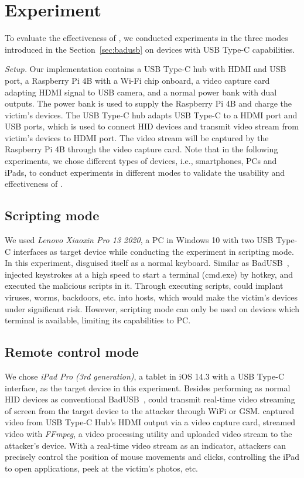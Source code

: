 \section{Experiment}
\label{sec:experiment}

To evaluate the effectiveness of \tool, we conducted experiments in the three modes introduced in the Section~\ref{sec:badusb} on devices with USB Type-C capabilities.

\textit{Setup.} Our implementation contains a USB Type-C hub with HDMI and USB port, a Raspberry Pi 4B with a Wi-Fi chip onboard, a video capture card adapting HDMI signal to USB camera, and a normal power bank with dual outputs.
The power bank is used to supply the Raspberry Pi 4B and charge the victim's devices.
The USB Type-C hub adapts USB Type-C to a HDMI port and USB ports, which is used to connect HID devices and transmit video stream from victim's devices to HDMI port. 
The video stream will be captured by the Raspberry Pi 4B through the video capture card.
Note that in the following experiments, we chose different types of devices, i.e., smartphones, PCs and iPads, to conduct experiments in different modes to validate the usability and effectiveness of \tool.

\subsection{Scripting mode}

We used \textit{Lenovo Xiaoxin Pro 13 2020}, a PC in Windows 10 with two USB Type-C interfaces as target device while conducting the experiment in scripting mode. 
In this experiment, \tool disguised itself as a normal keyboard.
Similar as BadUSB~\cite{badusb}, \tool injected keystrokes at a high speed to start a terminal (cmd.exe) by hotkey, and executed the malicious scripts in it.
Through executing scripts, \tool could implant viruses, worms, backdoors, etc. into hosts, which would make the victim's devices under significant risk.
However, scripting mode can only be used on devices which terminal is available, limiting its capabilities to PC.

\subsection{Remote control mode}
We chose \textit{iPad Pro (3rd generation)}, a tablet in iOS 14.3 with a USB Type-C interface, as the target device in this experiment.
Besides performing as normal HID devices as conventional BadUSB~\cite{badusb}, \tool could transmit real-time video streaming of screen from the target device to the attacker through WiFi or GSM.
\tool captured video from USB Type-C Hub's HDMI output via a video capture card, streamed video with \textit{FFmpeg}, a video processing utility and uploaded video stream to the attacker's device.
With a real-time video stream as an indicator, attackers can precisely control the position of mouse movements and clicks, controlling the iPad to open applications, peek at the victim's photos, etc.

